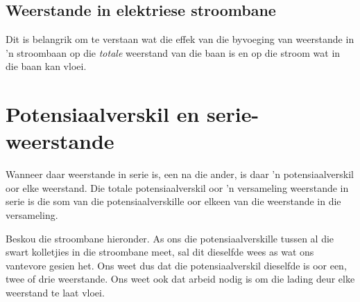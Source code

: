 \subsection*{Weerstande in elektriese stroombane}
Dit is belangrik om te verstaan wat die effek van die byvoeging van
weerstande in  'n stroombaan op die \textit{totale} weerstand van die baan is en
op die stroom wat in die baan kan vloei.


\section{Potensiaalverskil en serie-weerstande}

Wanneer daar weerstande in serie is, een na die ander, is daar 'n
potensiaalverskil oor elke weerstand. Die totale potensiaalverskil oor 'n
versameling weerstande in serie is die som van die potensiaalverskille oor
elkeen van die weerstande in die versameling.


Beskou die stroombane hieronder. As ons die potensiaalverskille tussen al die
swart kolletjies in die stroombane meet, sal dit dieselfde wees as wat ons
vantevore gesien het. Ons weet dus dat die potensiaalverskil dieselfde is oor
een, twee of drie weerstande. Ons weet ook dat arbeid nodig is om die lading
deur elke weerstand te laat vloei.

